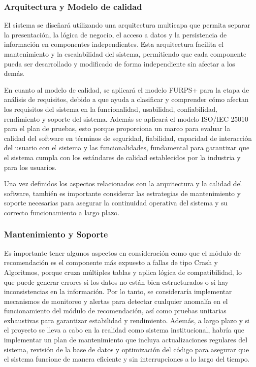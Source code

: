 \documentclass[11pt,a4paper]{Plantilla}
\begin{document}
\vspace{5pt}

\subsubsection*{Arquitectura y Modelo de calidad}
El sistema se diseñará utilizando una arquitectura multicapa que permita separar la presentación, la lógica de negocio, el acceso a datos y la persistencia de información en componentes independientes. Esta arquitectura facilita el mantenimiento y la escalabilidad del sistema, permitiendo que cada componente pueda ser desarrollado y modificado de forma independiente sin afectar a los demás.

\vspace{5pt}

En cuanto al modelo de calidad, se aplicará el modelo FURPS+ para la etapa de análisis de requisitos, debido a que ayuda a clasificar y comprender cómo afectan los requisitos del sistema en la funcionalidad, usabilidad, confiabilidad, rendimiento y soporte del sistema. Además se aplicará el modelo ISO/IEC 25010 para el plan de pruebas, esto porque proporciona un marco para evaluar la calidad del software en términos de seguridad, fiabilidad, capacidad de interacción del usuario con el sistema y las funcionalidades, fundamental para garantizar que el sistema cumpla con los estándares de calidad establecidos por la industria y para los usuarios.

\vspace{5pt}

Una vez definidos los aspectos relacionados con la arquitectura y la calidad del software, también es importante considerar las estrategias de mantenimiento y soporte necesarias para asegurar la continuidad operativa del sistema y su correcto funcionamiento a largo plazo.

\subsubsection*{Mantenimiento y Soporte}
Es importante tener algunos aspectos en consideración como que el módulo de recomendación es el componente más expuesto a fallas de tipo Crash y Algoritmos, porque cruza múltiples tablas y aplica lógica de compatibilidad, lo que puede generar errores si los datos no están bien estructurados o si hay inconsistencias en la información. Por lo tanto, se consideraría implementar mecanismos de monitoreo y alertas para detectar cualquier anomalía en el funcionamiento del módulo de recomendación, así como pruebas unitarias exhaustivas para garantizar estabilidad y rendimiento. Además, a largo plazo y si el proyecto se lleva a cabo en la realidad como sistema institucional, habría que implementar un plan de mantenimiento que incluya actualizaciones regulares del sistema, revisión de la base de datos y optimización del código para asegurar que el sistema funcione de manera eficiente y sin interrupciones a lo largo del tiempo.
\end{document}
